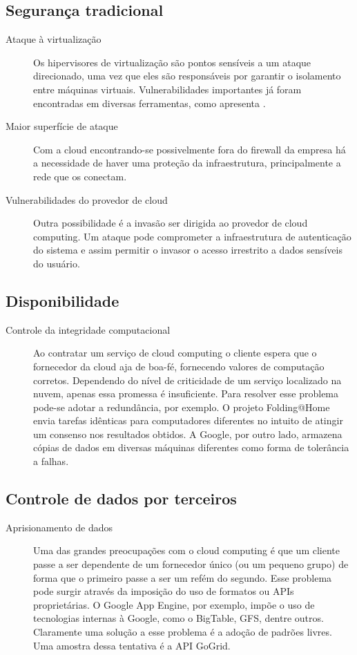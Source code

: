 \documentclass[brazil,12pt]{article}
\begin{document}
\subsection{Segurança tradicional}
\begin{description}
  \item[Ataque à virtualização] Os hipervisores de virtualização são pontos
  sensíveis a um ataque direcionado, uma vez que eles são responsáveis por
  garantir o isolamento entre máquinas virtuais. Vulnerabilidades importantes já
  foram encontradas em diversas ferramentas, como apresenta 
  \cite{controlling-data-in-cloud}.
  \item[Maior superfície de ataque] Com a cloud encontrando-se possivelmente
  fora do firewall da empresa há a necessidade de haver uma proteção da
  infraestrutura, principalmente a rede que os conectam.
  \item[Vulnerabilidades do provedor de cloud] Outra possibilidade é a invasão
  ser dirigida ao provedor de cloud computing. Um ataque pode comprometer a
  infraestrutura de autenticação do sistema e assim permitir o invasor o acesso
  irrestrito a dados sensíveis do usuário.
\end{description}

\subsection{Disponibilidade}
\begin{description}
  \item[Controle da integridade computacional] Ao contratar um serviço de cloud
  computing o cliente espera que o fornecedor da cloud aja de boa-fé, fornecendo
  valores de computação corretos. Dependendo do nível de criticidade de um
  serviço localizado na nuvem, apenas essa promessa é insuficiente. Para
  resolver esse problema pode-se adotar a redundância, por exemplo. O projeto
  Folding@Home envia tarefas idênticas para computadores diferentes no intuito
  de atingir um consenso nos resultados obtidos. A Google, por outro lado,
  armazena cópias de dados em diversas máquinas diferentes como forma de
  tolerância a falhas.
\end{description}


\subsection{Controle de dados por terceiros}
\begin{description}
  \item[Aprisionamento de dados] Uma das grandes preocupações com o cloud
  computing é que um cliente passe a ser dependente de um fornecedor único (ou
  um pequeno grupo) de forma que o primeiro passe a ser um refém do segundo.
  Esse problema pode surgir através da imposição do uso de formatos ou APIs
  proprietárias. O Google App Engine, por exemplo, impõe o uso de tecnologias
  internas à Google, como o BigTable, GFS, dentre outros. Claramente uma solução
  a esse problema é a adoção de padrões livres. Uma amostra dessa tentativa é a
  API GoGrid.
\end{description}
\end{document}
